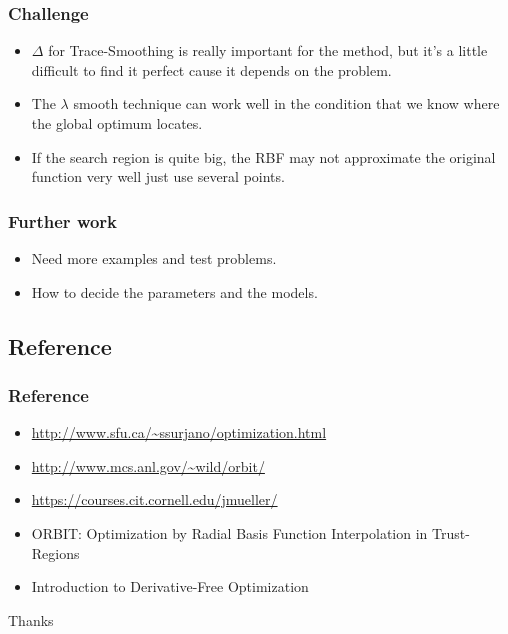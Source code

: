 \documentclass[hyperref={pdfpagelabels=false}]{beamer}
\begin{document}

\begin{frame}
\frametitle{Challenge}
\begin{itemize}
\item $\Delta$ for Trace-Smoothing is really important for the method, but it's a little difficult to find it perfect cause it depends on the problem.
\item The $\lambda$ smooth technique can work well in the condition that we know where the global optimum locates.
\item If the search region is quite big, the RBF may not approximate the original function very well just use several points.
\end{itemize}
\end{frame}


\begin{frame}
\frametitle{Further work}
\begin{itemize}
\item Need more examples and test problems.
\item How to decide the parameters and the models.
\end{itemize}
\end{frame}

\subsection{Reference}

\begin{frame}
\frametitle{Reference}
\begin{itemize}
\item \url{http://www.sfu.ca/~ssurjano/optimization.html}
\item \url{http://www.mcs.anl.gov/~wild/orbit/}
\item \url{https://courses.cit.cornell.edu/jmueller/}
\item ORBIT: Optimization by Radial Basis Function Interpolation in Trust-Regions
\item Introduction to Derivative-Free Optimization
\end{itemize}
\end{frame}


\begin{frame}
\Huge{\centerline{Thanks}}
\end{frame}

\end{document}
